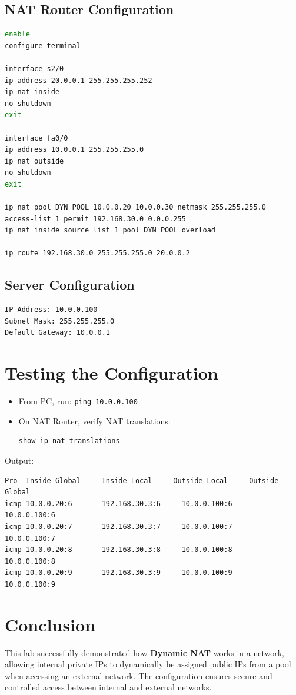 \documentclass[12pt]{article}
\begin{document}
\subsection{NAT Router Configuration}
\begin{lstlisting}[language=bash]
enable
configure terminal

interface s2/0
ip address 20.0.0.1 255.255.255.252
ip nat inside
no shutdown
exit

interface fa0/0
ip address 10.0.0.1 255.255.255.0
ip nat outside
no shutdown
exit

ip nat pool DYN_POOL 10.0.0.20 10.0.0.30 netmask 255.255.255.0
access-list 1 permit 192.168.30.0 0.0.0.255
ip nat inside source list 1 pool DYN_POOL overload

ip route 192.168.30.0 255.255.255.0 20.0.0.2
\end{lstlisting}

\subsection{Server Configuration}
\begin{lstlisting}
IP Address: 10.0.0.100
Subnet Mask: 255.255.255.0
Default Gateway: 10.0.0.1
\end{lstlisting}

\section*{Testing the Configuration}
\begin{itemize}
    \item From PC, run: \texttt{ping 10.0.0.100}
    \item On NAT Router, verify NAT translations:
\begin{lstlisting}[language=bash]
show ip nat translations
\end{lstlisting}
\end{itemize}

\noindent Output:
\begin{verbatim}
Pro  Inside Global     Inside Local     Outside Local     Outside Global
icmp 10.0.0.20:6       192.168.30.3:6     10.0.0.100:6       10.0.0.100:6
icmp 10.0.0.20:7       192.168.30.3:7     10.0.0.100:7       10.0.0.100:7
icmp 10.0.0.20:8       192.168.30.3:8     10.0.0.100:8       10.0.0.100:8
icmp 10.0.0.20:9       192.168.30.3:9     10.0.0.100:9       10.0.0.100:9
\end{verbatim}

\section*{Conclusion}
This lab successfully demonstrated how \textbf{Dynamic NAT} works in a network, allowing internal private IPs to dynamically be assigned public IPs from a pool when accessing an external network. The configuration ensures secure and controlled access between internal and external networks.
\end{document}
